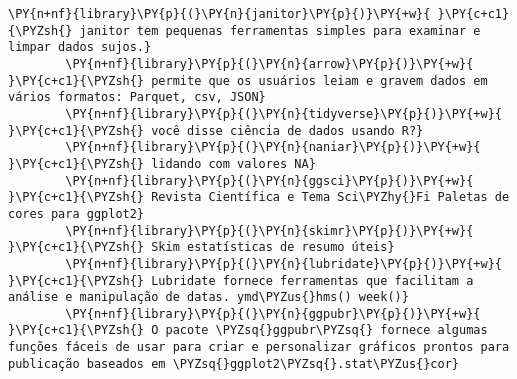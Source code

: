 \begin{tcolorbox}[breakable, size=fbox, boxrule=1pt, pad at break*=1mm,colback=cellbackground, colframe=cellborder]
    \begin{Verbatim}[commandchars=\\\{\}]
        \PY{n+nf}{library}\PY{p}{(}\PY{n}{janitor}\PY{p}{)}\PY{+w}{ }\PY{c+c1}{\PYZsh{} janitor tem pequenas ferramentas simples para examinar e limpar dados sujos.}
        \PY{n+nf}{library}\PY{p}{(}\PY{n}{arrow}\PY{p}{)}\PY{+w}{ }\PY{c+c1}{\PYZsh{} permite que os usuários leiam e gravem dados em vários formatos: Parquet, csv, JSON}
        \PY{n+nf}{library}\PY{p}{(}\PY{n}{tidyverse}\PY{p}{)}\PY{+w}{ }\PY{c+c1}{\PYZsh{} você disse ciência de dados usando R?}
        \PY{n+nf}{library}\PY{p}{(}\PY{n}{naniar}\PY{p}{)}\PY{+w}{ }\PY{c+c1}{\PYZsh{} lidando com valores NA}
        \PY{n+nf}{library}\PY{p}{(}\PY{n}{ggsci}\PY{p}{)}\PY{+w}{ }\PY{c+c1}{\PYZsh{} Revista Científica e Tema Sci\PYZhy{}Fi Paletas de cores para ggplot2}
        \PY{n+nf}{library}\PY{p}{(}\PY{n}{skimr}\PY{p}{)}\PY{+w}{ }\PY{c+c1}{\PYZsh{} Skim estatísticas de resumo úteis}
        \PY{n+nf}{library}\PY{p}{(}\PY{n}{lubridate}\PY{p}{)}\PY{+w}{ }\PY{c+c1}{\PYZsh{} Lubridate fornece ferramentas que facilitam a análise e manipulação de datas. ymd\PYZus{}hms() week()}
        \PY{n+nf}{library}\PY{p}{(}\PY{n}{ggpubr}\PY{p}{)}\PY{+w}{ }\PY{c+c1}{\PYZsh{} O pacote \PYZsq{}ggpubr\PYZsq{} fornece algumas funções fáceis de usar para criar e personalizar gráficos prontos para publicação baseados em \PYZsq{}ggplot2\PYZsq{}.stat\PYZus{}cor}
    \end{Verbatim}
\end{tcolorbox}

